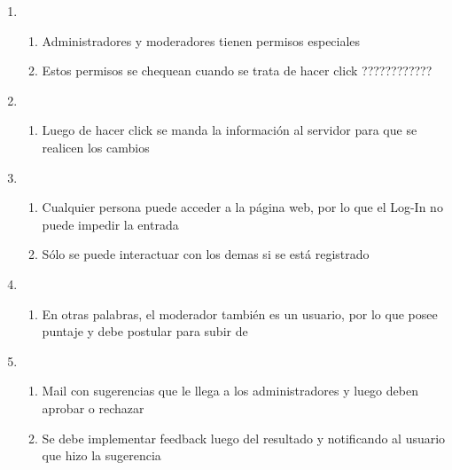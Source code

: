 \documentclass[12pt, letterpaper, notitlepage]{article}
\begin{document}
\begin{enumerate}
	\item {}
		\begin{enumerate}
			\item Administradores y moderadores tienen permisos especiales
			\item Estos permisos se chequean cuando se trata de hacer click ????????????
		\end{enumerate}
	
	\item {}
		\begin{enumerate}
			\item Luego de hacer click se manda la información al servidor para que se realicen los cambios
		\end{enumerate}
	
	\item {}
		\begin{enumerate}
			\item Cualquier persona puede acceder a la página web, por lo que el Log-In no puede impedir la entrada
			\item Sólo se puede interactuar con los demas si se está registrado
		\end{enumerate}				
		
	\item {}
		\begin{enumerate}
			\item En otras palabras, el moderador también es un usuario, por lo que posee puntaje y debe postular para subir de 
		\end{enumerate}
	
	\item {}
		\begin{enumerate}
			\item Mail con sugerencias que le llega a los administradores y luego deben aprobar o rechazar
			\item Se debe implementar feedback luego del resultado y notificando al usuario que hizo la sugerencia
		\end{enumerate}			
	
\end{enumerate}
\end{document}
